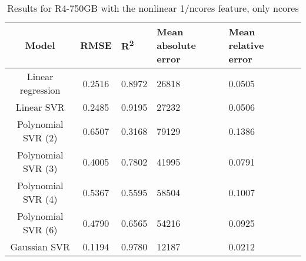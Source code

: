 \begin{table}[H]
\centering
\begin{adjustbox}{center}
\begin{tabular}{c | c M{1.2cm} M{2.5cm} M{2.5cm} M{1.8cm}}
Model & RMSE & R\textsuperscript{2} & Mean absolute error & Mean relative error \tabularnewline
\hline
Linear regression & 0.2516 & 0.8972 &  26818 & 0.0505 \\
Linear SVR & 0.2485 & 0.9195 &  27232 & 0.0506 \\
Polynomial SVR (2) & 0.6507 & 0.3168 &  79129 & 0.1386 \\
Polynomial SVR (3) & 0.4005 & 0.7802 &  41995 & 0.0791 \\
Polynomial SVR (4) & 0.5367 & 0.5595 &  58504 & 0.1007 \\
Polynomial SVR (6) & 0.4790 & 0.6565 &  54216 & 0.0925 \\
Gaussian SVR & 0.1194 & 0.9780 &  12187 & 0.0212 \\
\end{tabular}
\end{adjustbox}
\\
\caption{Results for R4-750GB with the nonlinear 1/ncores feature, only ncores}
\label{tab:all_nonlinear_R4_750}
\end{table}
